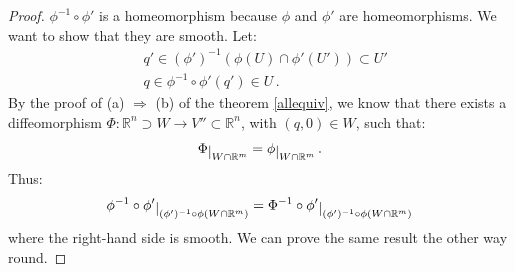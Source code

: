 \documentclass[a4paper,11pt,titlepage, article, oneside]{memoir}
\numberwithin{equation}{section}
\theoremstyle{definition}
\theoremstyle{remark}
\newcommand{\rfield}{\mathbb{R}}
\newcommand{\restrict}[2]{{#1}\raisebox{-.5ex}{$|$}_{#2}}
\begin{document}
\begin{proof}
$\phi^{-1} \circ \phi'$ is a homeomorphism because $\phi$ and $\phi'$ are homeomorphisms. We want to show that they are smooth. Let:
\begin{align*}
&q' \in (\phi')^{-1}(\phi(U) \cap \phi'(U')) \subset U' \\
&q \in \phi^{-1} \circ \phi' (q') \in U \, .
\end{align*}
By the proof of (a) $\Rightarrow$ (b) of the theorem \ref{allequiv}, we know that there exists a diffeomorphism $\Phi \colon \rfield^n \supset W \rightarrow V'' \subset \rfield^n$, with $(q, 0) \in W$, such that:
\[ \restrict{\Phi}{W \cap \rfield^m} = \restrict{\phi}{W \cap \rfield^m} \, . \]
Thus:
\[\restrict{\phi^{-1} \circ \phi'}{(\phi')^{-1} \circ \phi(W \cap \rfield^m)} = \restrict{\Phi^{-1} \circ \phi'}{(\phi')^{-1} \circ \phi(W \cap \rfield^m)} \]
where the right-hand side is smooth. We can prove the same result the other way round.
\end{proof}
\end{document}
